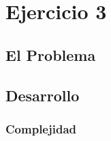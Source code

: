 \section{Ejercicio 3}

\subsection{El Problema}

\subsection{Desarrollo}

\subsubsection{Complejidad}
